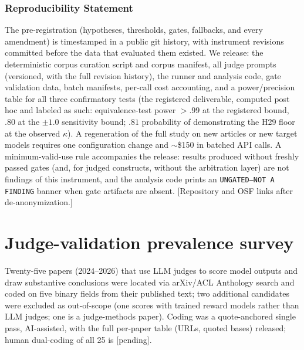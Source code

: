 \documentclass{article}
\newcommand{\pending}[1]{\textcolor{orange!80!black}{[#1]}}
\newcommand{\kap}{\kappa}
\begin{document}
\subsubsection*{Reproducibility Statement}
The pre-registration (hypotheses, thresholds, gates, fallbacks, and every
amendment) is timestamped in a public git history, with instrument
revisions committed before the data that evaluated them existed. We
release: the deterministic corpus curation script and corpus manifest, all
judge prompts (versioned, with the full revision history), the runner and
analysis code, gate validation data, batch manifests, per-call cost
accounting, and a power/precision table for all three confirmatory tests
(the registered deliverable, computed post hoc and labeled as such:
equivalence-test power ${>}.99$ at the registered bound, $.80$ at the $\pm1.0$
sensitivity bound; $.81$ probability of demonstrating the H29 floor at
the observed $\kap$). A regeneration of the full study on new articles
or new target models requires one configuration change and
$\sim$\$150 in batched API calls. A minimum-valid-use rule accompanies
the release: results produced without freshly passed gates (and, for
judged constructs, without the arbitration layer) are not findings of
this instrument, and the analysis code prints an
\texttt{UNGATED---NOT A FINDING} banner when gate artifacts are absent.
\pending{Repository and OSF links after de-anonymization.}

\appendix
\section{Judge-validation prevalence survey}
\label{app:survey}
Twenty-five papers (2024--2026) that use LLM judges to score model
outputs and draw substantive conclusions were located via arXiv/ACL
Anthology search and coded on five binary fields from their published
text; two additional candidates were excluded as out-of-scope (one
scores with trained reward models rather than LLM judges; one is a
judge-methods paper). Coding was a quote-anchored single pass,
AI-assisted, with the full per-paper table (URLs, quoted bases)
released; human dual-coding of all 25 is \pending{pending}.
\end{document}
